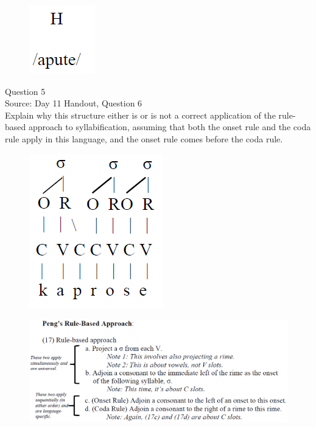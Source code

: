 \documentclass[12pt]{article}
\begin{document}
\begin{figure}[H]
\includegraphics{../images/mendetone_b.png}
\end{figure}

\newpage

{\large Question 5}\\

Source: Day 11 Handout, Question 6\\

Explain why this structure either is or is not a correct application of the rule-based approach to syllabification, assuming that both the onset rule and the coda rule apply in this language, and the onset rule comes before the coda rule.\\

\begin{figure}[H]
\includegraphics{../images/pengrules_kaprose_no.png}
\end{figure}
\begin{figure}[H]
\includegraphics{../images/peng_rules.png}
\end{figure}
\end{document}
